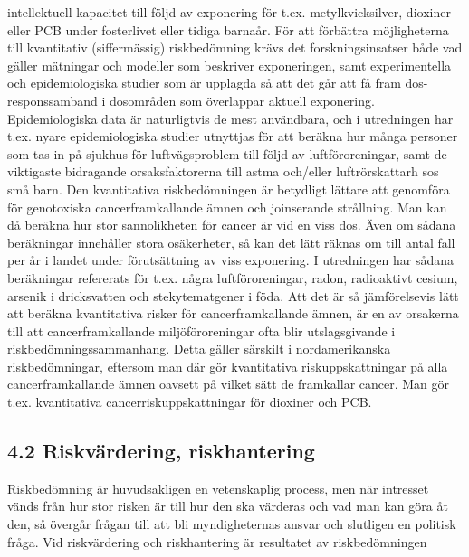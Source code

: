 intellektuell kapacitet till följd av exponering för t.ex. metylkvicksilver, dioxiner eller PCB under fosterlivet eller tidiga barnaår.
För att förbättra möjligheterna till kvantitativ (siffermässig) riskbedömning krävs det forskningsinsatser både vad gäller mätningar och modeller som beskriver exponeringen, samt experimentella och epidemiologiska studier som är upplagda så att det går att få fram dos-responssamband i dosområden som överlappar aktuell exponering. Epidemiologiska data är naturligtvis de mest användbara, och i utredningen har t.ex. nyare epidemiologiska studier utnyttjas för att beräkna hur många personer som tas in på sjukhus för luftvägsproblem till följd av luftföroreningar, samt de viktigaste bidragande orsaksfaktorerna till astma och/eller luftrörskattarh sos små barn.
Den kvantitativa riskbedömningen är betydligt lättare att genomföra för genotoxiska cancerframkallande ämnen och joinserande strållning. Man kan då beräkna hur stor sannolikheten för cancer är vid en viss dos. Även om sådana beräkningar innehåller stora osäkerheter, så kan det lätt räknas om till antal fall per år i landet under förutsättning av viss exponering. I utredningen har sådana beräkningar refererats för t.ex. några luftföroreningar, radon, radioaktivt cesium, arsenik i dricksvatten och stekytematgener i föda.
Att det är så jämförelsevis lätt att beräkna kvantitativa risker för cancerframkallande ämnen, är en av orsakerna till att cancerframkallande miljöföroreningar ofta blir utslagsgivande i riskbedömningssammanhang. Detta gäller särskilt i nordamerikanska riskbedömningar, eftersom man där gör kvantitativa riskuppskattningar på alla cancerframkallande ämnen oavsett på vilket sätt de framkallar cancer. Man gör t.ex. kvantitativa cancerriskuppskattningar för dioxiner och PCB.
\subsection*{4.2 Riskvärdering, riskhantering}
Riskbedömning är huvudsakligen en vetenskaplig process, men när intresset vänds från hur stor risken är till hur den ska värderas och vad man kan göra åt den, så övergår frågan till att bli myndigheternas ansvar och slutligen en politisk fråga. Vid riskvärdering och riskhantering är resultatet av riskbedömningen

